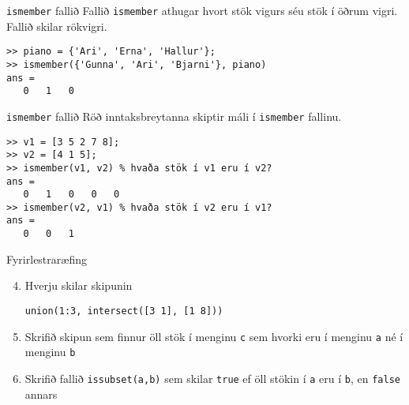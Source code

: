 \documentclass{beamer}
\begin{document}
\begin{frame}[fragile]{\texttt{ismember} fallið}
\vspace{\baselineskip}
Fallið \texttt{ismember} athugar hvort stök vigurs séu stök í öðrum vigri. Fallið skilar rökvigri.
\begin{verbatim}
>> piano = {'Ari', 'Erna', 'Hallur'};
>> ismember({'Gunna', 'Ari', 'Bjarni'}, piano)
ans =
   0   1   0
\end{verbatim}
\end{frame}

\begin{frame}[fragile]{\texttt{ismember} fallið}
\vspace{\baselineskip}
Röð inntaksbreytanna skiptir máli í \texttt{ismember} fallinu.
\begin{verbatim}
>> v1 = [3 5 2 7 8];
>> v2 = [4 1 5];
>> ismember(v1, v2) % hvaða stök í v1 eru í v2?
ans =
   0   1   0   0   0
>> ismember(v2, v1) % hvaða stök í v2 eru í v1?
ans =
   0   0   1
\end{verbatim}
\end{frame}

\begin{frame}[fragile]{Fyrirlestraræfing}
\begin{enumerate}
 \setcounter{enumi}{3}
 \item Hverju skilar skipunin
\begin{verbatim}
union(1:3, intersect([3 1], [1 8]))
\end{verbatim}
 \item Skrifið skipun sem finnur öll stök í menginu \texttt{c} sem hvorki eru í menginu \texttt{a} né í menginu \texttt{b}
 \item Skrifið fallið \texttt{issubset(a,b)} sem skilar \texttt{true} ef öll stökin í \texttt{a} eru í \texttt{b}, en \texttt{false} annars
\end{enumerate}
\end{frame}
\end{document}
